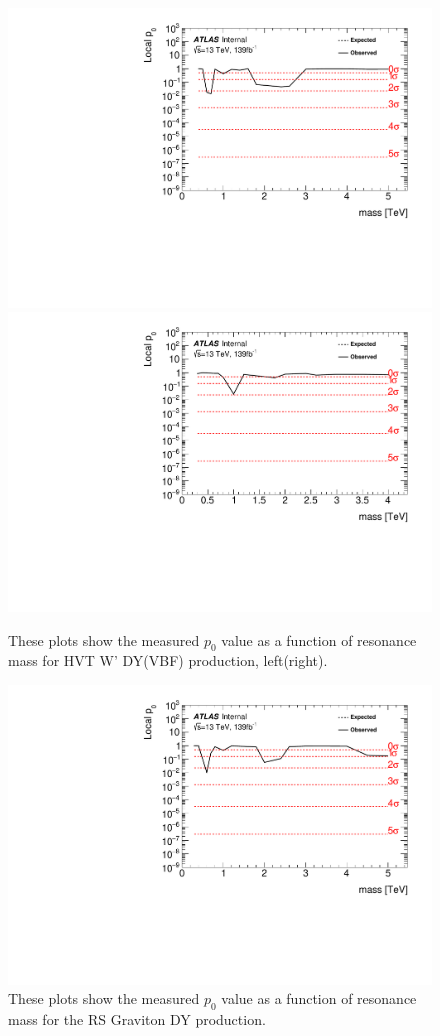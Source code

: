 \begin{figure}[h!]
  \centering
  \includegraphics[width=0.48\hsize]{figures/results/pvalues/fixed_pvalues/hvtwz_pvalue.pdf}
    \includegraphics[width=0.48\hsize]{figures/results/pvalues/fixed_pvalues/hvtwzvbf_pvalue.pdf}
 \caption{These plots show the measured $p_{0}$ value as a function of resonance mass for HVT W' DY(VBF) production, left(right).} 
  \label{fig:discov_hvtwz}
\end{figure} 
\FloatBarrier



\begin{figure}[h!]
  \centering
  \includegraphics[width=0.48\hsize]{figures/results/pvalues/fixed_pvalues/rsg_pvalue.pdf}
 \caption{These plots show the measured $p_{0}$ value as a function of resonance mass for the RS Graviton DY production.} 
  \label{fig:discov_rsg}
\end{figure} 
\FloatBarrier


